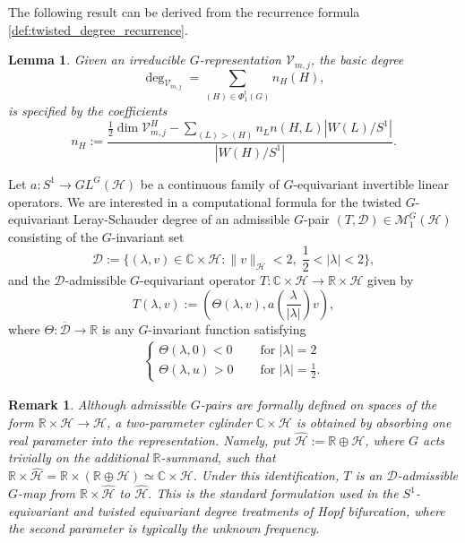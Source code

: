 \documentclass[twoside,11pt]{article}
\def\bc{{\mathbb{C}}}
\def\br{{\mathbb{R}}}
\newtheorem{lemma}[theorem]{Lemma}
\newtheorem{remark}[theorem]{Remark}
\begin{document}
The following result can be derived from the recurrence formula \eqref{def:twisted_degree_recurrence}.
\begin{lemma} \rm
Given an irreducible  $G$-representation $\mathcal V_{m,j}$, the basic degree
    \[
    \deg_{\mathcal V_{m,j}} = \sum\limits_{(H) \in \Phi_1^t(G)} n_H (H),
    \]
is specified by the coefficients
    \[
    n_H := \frac{\frac{1}{2}\dim \mathcal V_{m,j}^H - \sum_{(L)>(H)} n_L n(H,L)|W(L)/S^1|}{|W(H)/S^1|}.
    \]
\end{lemma}
Let $a: S^1 \rightarrow GL^{G}(\mathcal H)$ be a continuous family of $G$-equivariant invertible linear operators. 
We are interested in a computational formula for the twisted $G$-equivariant Leray-Schauder degree of an admissible $G$-pair $(T,\mathscr D) \in \mathcal M^{G}_1(\mathcal H)$ consisting of the $G$-invariant set
\[
\mathscr D := \{ (\lambda,v) \in \bc \times \mathcal H : \| v \|_{\mathcal H} < 2, \; \frac{1}{2} < | \lambda | < 2 \},
\]
and the $\mathscr D$-admissible $G$-equivariant operator $T: \bc \times \mathcal H \rightarrow \br \times \mathcal H$ given by
\[
T(\lambda,v) := \left(\Theta(\lambda,v), a\left(\frac{\lambda}{|\lambda|}\right)v\right),
\]
where $\Theta: \overline{\mathscr D} \rightarrow \br$ is any $G$-invariant function satisfying
\begin{align*} 
\begin{cases}
\Theta(\lambda,0) < 0 \quad & \text{ for } |\lambda | = 2 \\
\Theta(\lambda,u) > 0  \quad & \text{ for } |\lambda | = \frac{1}{2}.
\end{cases}    
\end{align*}
\begin{remark}
Although admissible
$G$-pairs are formally defined on spaces of the form $\mathbb R\times \mathcal H \to \mathcal H$, a two-parameter cylinder $\mathbb C\times\mathcal H$ is obtained by absorbing one real parameter into
the representation.  Namely, put $\widehat{\mathcal H}:=\mathbb R\oplus\mathcal H$, where $G$ acts trivially on the additional $\mathbb R$-summand, such that $\mathbb R\times\widehat{\mathcal H} = \mathbb R\times(\mathbb R\oplus\mathcal H)
\simeq \mathbb C\times\mathcal H$.
Under this identification, $T$ is an $\mathscr D$-admissible $G$-map from $\mathbb R\times\widehat{\mathcal H}$ to $\widehat{\mathcal H}$. This is the standard formulation used in the $S^1$-equivariant and twisted equivariant degree treatments of Hopf
bifurcation, where the second parameter is typically the unknown frequency.
\end{remark}
\end{document}
